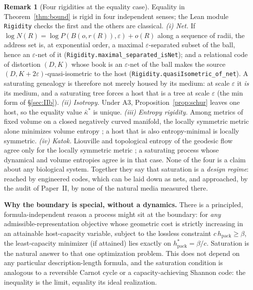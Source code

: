 \documentclass[11pt,reqno]{amsart}
\theoremstyle{plain}
\theoremstyle{definition}
\newtheorem{remark}[theorem]{Remark}
\newcommand{\hpack}{h_{\mathrm{pack}}}
\newcommand{\eps}{\varepsilon}
\begin{document}
\begin{remark}[Four rigidities at the equality case]\label{rem:rigidity}
Equality in Theorem~\ref{thm:bound} is rigid in four independent senses; the Lean module \texttt{Rigidity} checks the
first and the others are classical.
\emph{(i) Net.} If $\log N(R)=\log P(B(o,r(R)),\eps)+o(R)$ along a sequence of radii, the address set is, at
exponential order, a maximal $\eps$-separated subset of the ball, hence an $\eps$-net of it
(\texttt{Rigidity.maximal\_separated\_isNet}); and a relational code of distortion $(D,K)$ whose book is an $\eps$-net
of the ball makes the source $(D,K+2\eps)$-quasi-isometric to the host (\texttt{Rigidity.quasiIsometric\_of\_net}). A
saturating genealogy is therefore not merely housed by its medium: at scale $\eps$ it \emph{is} its medium, and a
saturating tree forces a host that is a tree at scale $\eps$ (the min form of \S\ref{sec:IIb}).
\emph{(ii) Isotropy.} Under A3, Proposition~\ref{prop:schur} leaves one host, so the equality value $\bar\kappa^*$ is
unique.
\emph{(iii) Entropy rigidity.} Among metrics of fixed volume on a closed negatively curved manifold, the locally
symmetric metric alone minimizes volume entropy \cite{bcg1995}; a host that is also entropy-minimal is locally
symmetric.
\emph{(iv) Katok.} Liouville and topological entropy of the geodesic flow agree only for the locally symmetric metric
\cite{katok1982}; a saturating process whose dynamical and volume entropies agree is in that case.
None of the four is a claim about any biological system. Together they say that saturation is a \emph{design regime}:
reached by engineered codes, which can be laid down as nets, and approached, by the audit of Paper~II, by none of the
natural media measured there.
\end{remark}

\noindent\textbf{Why the boundary is special, without a dynamics.} There is a principled, formula-independent reason a process might sit at the boundary: for \emph{any} admissible-representation objective whose geometric cost is strictly increasing in an attainable host-capacity variable, subject to the lossless constraint $c\,\hpack\ge\beta$, the least-capacity minimizer (if attained) lies exactly on $\hpack^*=\beta/c$. Saturation is the natural answer to that one optimization problem. This does not depend on any particular description-length formula, and the saturation condition is analogous to a reversible Carnot cycle or a capacity-achieving Shannon code: the inequality is the limit, equality its ideal realization.
\end{document}
